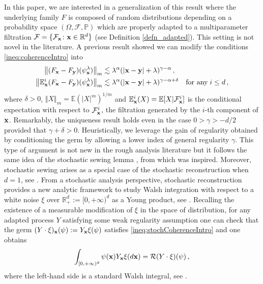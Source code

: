\documentclass[12pt]{article}
\numberwithin{equation}{section}
\theoremstyle{plain}
\theoremstyle{definition}
\newcommand{\abs}[1]{\left\vert #1 \right\vert}
\newcommand{\norm}[1]{\left\Vert #1\right\Vert}
\def\bE{\mathbb{E}}\def\bW{\mathbb{W}}
\def\fy{\mathbf y}\def\fz{\mathbf z}
\begin{document}
In this paper, we are interested in a generalization of this result where the underlying family $F$ is composed of random distributions depending on a probability space  $(\Omega, \mathcal{F}, \mathbb P)$ which are properly adapted to a multiparameter filtration $\mathcal{F}=\{\mathcal{F}_{\mathbf x} \colon \mathbf x\in \mathbb R^d\}$ (see Definition \ref{defn_adapted}). This setting is not novel in the literature. A previous result \cite{kern2021} showed we can modify the conditions \eqref{ineq:coherenceIntro}  into
\begin{align}
\begin{split}\label{ineq:stochCoherenceIntro}
    \norm{(F_\fx- F_\fy)(\psi_\fx^\lambda)}_m &\lesssim \lambda^{\alpha}(|\fx- \fy|+ \lambda)^{\gamma- \alpha}\,, \\ 
    \norm{\bE^i_{\fx}(F_\fx- F_\fy)(\psi_\fx^\lambda)}_m &\lesssim \lambda^\alpha(\abs{\fx-\fy}+\lambda)^{\gamma-\alpha+\delta}\quad \text{for any}\;  i\leq d\,,
\end{split}
\end{align}
where $\delta>0$,  $ \Vert X \Vert_{m}= \mathbb E (|X|^m)^{1/m}$ and  $\bE^i_{\fx}(X)=\bE[X|\cF^i_\fx]$ is the conditional expectation with respect to  $\mathcal{F}^i_\mathbf x$, the  filtration generated by the $i$-th component of $\mathbf x$. Remarkably, the uniqueness result holds even in the case $0>\gamma>-d/2$ provided that $\gamma+ \delta>0$. Heuristically, we leverage the gain of regularity obtained by conditioning the germ by allowing  a lower index of general regularity $\gamma$. This type of argument is not new in the rough analysis literature but  it follows the same idea of the stochastic sewing lemma \cite{le2020}, from which  \cite{kern2021} was inspired. Moreover, stochastic sewing arises as a special case of the stochastic reconstruction when $d=1$, see \cite[Section 5]{kern2021}. From a stochastic analysis perspective, stochastic reconstruction provides a  new analytic framework to study Walsh integration \cite{walsh1986} with respect to a white noise $\xi$ over $\mathbb R^d_+:=[0,+ \infty)^d$ as a Young product, see \cite{zambotti2020}. Recalling the existence of a measurable modification of $\xi$ in the space of distribution, for any adapted process $Y$ satisfying some weak regularity assumption one can check that the germ $(Y\cdot \xi)_{\mathbf x}(\psi):=Y_{\mathbf x}\xi(\psi) $ satisfies \eqref{ineq:stochCoherenceIntro} and one obtains 
\begin{equation}\label{eq_sto_integral}
\int_{[0, +\infty)^d}\psi(\fx)Y_{\fx}\xi(d\fx)=\mathcal{R}(Y\cdot\xi)(\psi)\,,\end{equation}
where the left-hand side is a standard Walsh integral, see \cite[Theorem 53]{kern2021}.
\end{document}
